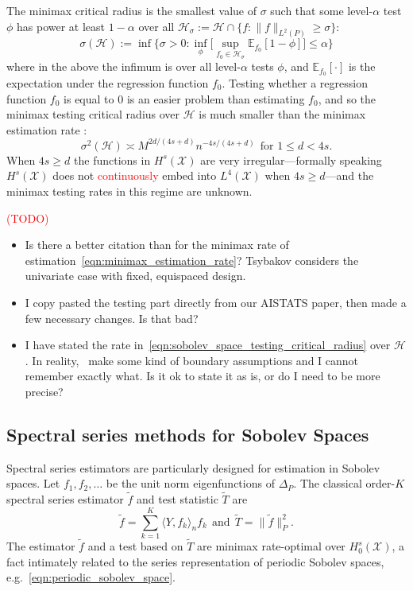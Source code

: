 \documentclass{article}
\newcommand{\1}{\mathbf{1}}
\newcommand{\Xset}{\mathcal{X}}
\newcommand{\Leb}{L}
\newcommand{\mc}[1]{\mathcal{#1}}
\newcommand{\Ebb}{\mathbb{E}}
\newcommand{\dotp}[2]{\langle #1, #2 \rangle}
\newcommand{\wt}[1]{\widetilde{#1}}
\theoremstyle{alden}
\theoremstyle{aldenthm}
\theoremstyle{definition}
\theoremstyle{remark}
\begin{document}
The minimax critical radius is the smallest value of $\sigma$ such that some level-${\alpha}$ test $\phi$ has power at least $1 - \alpha$ over all $\mc{H}_{\sigma} := \mc{H} \cap \{f: \|f\|_{\Leb^2(P)} \geq \sigma\}$:
\begin{equation*}
\sigma(\mc{H}) := \inf\Biggl\{\sigma > 0: \inf_{\phi} \biggl[ \sup_{f_0 \in \mc{H}_{\sigma}} \Ebb_{f_0}[1 - \phi]\biggr] \leq \alpha\Biggr\}
\end{equation*} 
where in the above the infimum is over all level-$\alpha$ tests $\phi$, and $\Ebb_{f_0}[\cdot]$ is the expectation under the regression function $f_0$. Testing whether a regression function $f_0$ is equal to $0$ is an easier problem than estimating $f_0$, and so the minimax testing critical radius over $\mc{H}$ is much smaller than the minimax estimation rate \citep{ingster2009}:
\begin{equation}
\label{eqn:sobolev_space_testing_critical_radius}
\sigma^2(\mc{H}) \asymp M^{2d/(4s + d)}n^{-4s/(4s + d)}~~\textrm{for $1 \leq d < 4s$.}
\end{equation}
When $4s \geq d$ the functions in $H^s(\Xset)$ are very irregular---formally speaking $H^s(\Xset)$ does not \textcolor{red}{continuously} embed into $\Leb^4(\Xset)$ when $4s \geq d$---and the minimax testing rates in this regime are unknown.

\textcolor{red}{(TODO)}
\begin{itemize}
	\item Is there a better citation than \citet{tsybakov2008_book} for the minimax rate of estimation~\eqref{eqn:minimax_estimation_rate}? Tsybakov considers the univariate case with fixed, equispaced design.
	\item I copy pasted the testing part directly from our AISTATS paper, then made a few necessary changes. Is that bad?
	\item I have stated the rate in~\eqref{eqn:sobolev_space_testing_critical_radius} over $\mc{H}$. In reality,~\citep{ingster2009} make some kind of boundary assumptions and I cannot remember exactly what. Is it ok to state it as is, or do I need to be more precise?
\end{itemize}

\subsection{Spectral series methods for Sobolev Spaces}
Spectral series estimators are particularly designed for estimation in Sobolev spaces. Let $f_1,f_2,\ldots$ be the unit norm eigenfunctions of $\Delta_P$. The classical order-$K$ spectral series estimator $\wt{f}$ and test statistic $\wt{T}$ are
\begin{equation*}
\wt{f} = \sum_{k = 1}^{K} \dotp{Y}{f_k}_n f_k~~\textrm{and}~~\wt{T} = \|\wt{f}\|_P^2.
\end{equation*}
The estimator $\wt{f}$ and a test based on $\wt{T}$ are minimax rate-optimal over $H_0^s(\mc{X})$, a fact intimately related to the series representation of periodic Sobolev spaces, e.g.~\eqref{eqn:periodic_sobolev_space}. 
\end{document}
